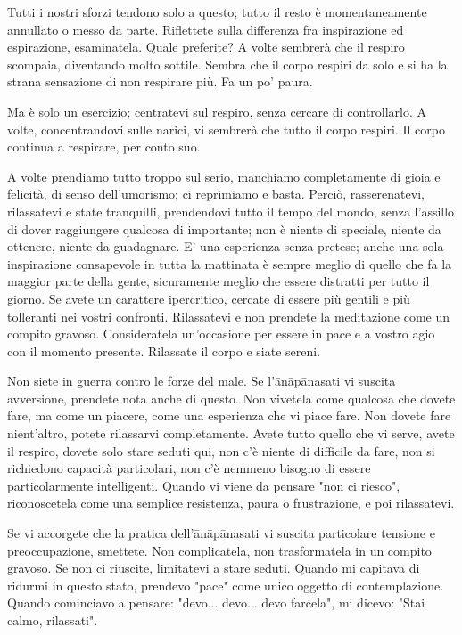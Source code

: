 Tutti i nostri sforzi tendono solo a questo; tutto il resto è
momentaneamente annullato o messo da parte. Riflettete sulla differenza
fra inspirazione ed espirazione, esaminatela. Quale preferite? A volte
sembrerà che il respiro scompaia, diventando molto sottile. Sembra che
il corpo respiri da solo e si ha la strana sensazione di non respirare
più. Fa un po' paura.

Ma è solo un esercizio; centratevi sul respiro, senza cercare di
controllarlo. A volte, concentrandovi sulle narici, vi sembrerà che
tutto il corpo respiri. Il corpo continua a respirare, per conto suo.

A volte prendiamo tutto troppo sul serio, manchiamo completamente di
gioia e felicità, di senso dell'umorismo; ci reprimiamo e basta. Perciò,
rasserenatevi, rilassatevi e state tranquilli, prendendovi tutto il
tempo del mondo, senza l'assillo di dover raggiungere qualcosa di
importante; non è niente di speciale, niente da ottenere, niente da
guadagnare. E' una esperienza senza pretese; anche una sola inspirazione
consapevole in tutta la mattinata è sempre meglio di quello che fa la
maggior parte della gente, sicuramente meglio che essere distratti per
tutto il giorno. Se avete un carattere ipercritico, cercate di essere
più gentili e più tolleranti nei vostri confronti. Rilassatevi e non
prendete la meditazione come un compito gravoso. Consideratela
un'occasione per essere in pace e a vostro agio con il momento presente.
Rilassate il corpo e siate sereni.

Non siete in guerra contro le forze del male. Se l'ānāpānasati vi
suscita avversione, prendete nota anche di questo. Non vivetela come
qualcosa che dovete fare, ma come un piacere, come una esperienza che vi
piace fare. Non dovete fare nient'altro, potete rilassarvi
completamente. Avete tutto quello che vi serve, avete il respiro, dovete
solo stare seduti qui, non c'è niente di difficile da fare, non si
richiedono capacità particolari, non c'è nemmeno bisogno di essere
particolarmente intelligenti. Quando vi viene da pensare "non ci
riesco", riconoscetela come una semplice resistenza, paura o
frustrazione, e poi rilassatevi.

Se vi accorgete che la pratica dell'ānāpānasati vi suscita particolare
tensione e preoccupazione, smettete. Non complicatela, non trasformatela
in un compito gravoso. Se non ci riuscite, limitatevi a stare seduti.
Quando mi capitava di ridurmi in questo stato, prendevo "pace" come
unico oggetto di contemplazione. Quando cominciavo a pensare: "devo...
devo... devo farcela", mi dicevo: "Stai calmo, rilassati".

